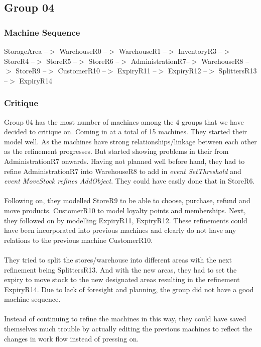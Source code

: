 \subsection{Group 04}
\label{group04}

\subsubsection{Machine Sequence}
\label{machinesequence}

StorageArea --$>$ WarehouseR0 --$>$ WarehouseR1 --$>$ InventoryR3 --$>$ StoreR4 --$>$ StoreR5 --$>$ StoreR6 --$>$ AdministrationR7--$>$ WarehouseR8 --$>$ StoreR9 --$>$ CustomerR10 --$>$ ExpiryR11 --$>$ ExpiryR12 --$>$ SplittersR13 --$>$ ExpiryR14

\subsubsection{Critique}
\label{critique}

Group 04 has the most number of machines among the 4 groups that we have decided to critique on. Coming in at a total of 15 machines. They started their model well. As the machines have strong relationships\slash linkage between each other as the refinement progresses. But started showing problems in their from AdministrationR7 onwards. Having not planned well before hand, they had to refine AdministrationR7 into WarehouseR8 to add in \emph{event SetThreshold} and \emph{event MoveStock refines AddObject}. They could have easily done that in StoreR6.  \\ \\  Following on, they modelled StoreR9 to be able to choose, purchase, refund and move products. CustomerR10 to model loyalty points and memberships. Next, they followed on by modelling ExpiryR11, ExpiryR12. These refinements could have been incorporated into previous machines and clearly do not have any relations to the previous machine CustomerR10.  \\ \\  They tried to split the stores\slash warehouse into different areas with the next refinement being SplittersR13. And with the new areas, they had to set the expiry to move stock to the new designated areas resulting in the refinement ExpiryR14. Due to lack of foresight and planning, the group did not have a good machine sequence.  \\ \\  Instead of continuing to refine the machines in this way, they could have saved themselves much trouble by actually editing the previous machines to reflect the changes in work flow instead of pressing on.

